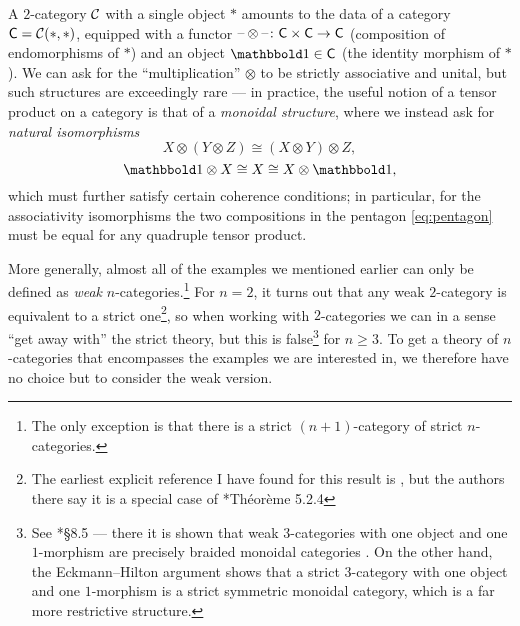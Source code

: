 \documentclass[a4paper,11pt]{article}
\begin{document}
\begin{ex}
  A $2$-category $\mathcal{C}$ with a single object $*$ amounts to the data of a
  category $\textup{\textsf{C}} = \mathcal{C}(*, *)$, equipped with a functor
  $\blank\otimes\blank \colon \uC \times \uC \to \uC$ (composition of
  endomorphisms of $*$) and an object $\bbone \in \uC$ (the identity
  morphism of $*$). We can ask for the ``multiplication'' $\otimes$ to
  be strictly associative and unital, but such structures are
  exceedingly rare --- in practice, the useful notion of a tensor
  product on a category is that of a \emph{monoidal structure}, where
  we instead ask for \emph{natural isomorphisms}
  \[ X \otimes (Y \otimes Z) \cong (X \otimes Y) \otimes Z,\]
  \[ \bbone \otimes X \cong X \cong X \otimes \bbone,\] which must
  further satisfy certain coherence conditions; in particular, for the associativity
  isomorphisms 
  the two compositions in the pentagon
  \cref{eq:pentagon} must be equal for any quadruple tensor product.
\end{ex}
More generally, almost all of the examples we mentioned earlier can
only be defined as \emph{weak} $n$-categories.\footnote{The only
  exception is that there is a strict $(n+1)$-category of strict
  $n$-categories.} For $n=2$, it turns out that any weak $2$-category
is equivalent to a strict one\footnote{The earliest explicit reference
  I have found for this result is \cite{MacLanePare}, but the authors
  there say it is a special case of \cite{Ben68}*{Th\'eor\`eme
    5.2.4}}, so when working with $2$-categories we can in a sense
``get away with'' the strict theory, but this is false\footnote{See
  \cite{GordonPowerStreet}*{\S 8.5} --- there it is shown that weak
  $3$-categories with one object and one $1$-morphism are precisely
  braided monoidal categories \cite{JoyalStreet}. On the other hand,
  the Eckmann--Hilton argument shows that a strict $3$-category with
  one object and one $1$-morphism is a strict symmetric monoidal
  category, which is a far more restrictive structure.} for
$n \geq 3$. To get a theory of $n$-categories that encompasses the
examples we are interested in, we therefore have no choice but to
consider the weak version.
\end{document}
